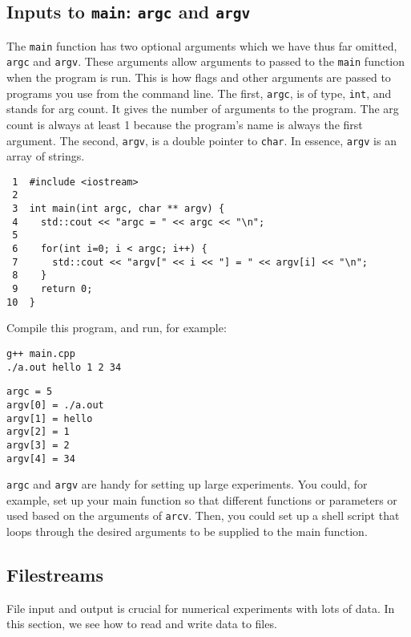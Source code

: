 \documentclass[11pt]{article}
\begin{document}
\subsection{Inputs to \texttt{main}: \texttt{argc} and \texttt{argv}}
\label{sec:orgheadline35}
The \texttt{main} function has two optional arguments which we have thus far omitted, 
\texttt{argc} and \texttt{argv}. These arguments allow arguments to passed to the \texttt{main} 
function when the program is run. This is how flags and other arguments are 
passed to programs you use from the command line. The first, \texttt{argc}, is of 
type, \texttt{int}, and stands for arg count. It gives the number of arguments 
to the program. The arg count is always at least 1 because the program's 
name is always the first argument. The second, \texttt{argv}, is a double pointer to
\texttt{char}. In essence, \texttt{argv} is an array of strings.

\begin{verbatim}
 1  #include <iostream>
 2  
 3  int main(int argc, char ** argv) {
 4    std::cout << "argc = " << argc << "\n";
 5  
 6    for(int i=0; i < argc; i++) {
 7      std::cout << "argv[" << i << "] = " << argv[i] << "\n";
 8    }
 9    return 0;
10  }
\end{verbatim}

Compile this program, and run, for example:

\begin{verbatim}
g++ main.cpp
./a.out hello 1 2 34
\end{verbatim}

\begin{verbatim}
argc = 5
argv[0] = ./a.out
argv[1] = hello
argv[2] = 1
argv[3] = 2
argv[4] = 34
\end{verbatim}

\texttt{argc} and \texttt{argv} are handy for setting up large experiments. You could, for 
example, set up your main function so that different functions or parameters 
or used based on the arguments of \texttt{arcv}. Then, you could set up a shell 
script that loops through the desired arguments to be supplied to the main 
function.

\subsection{Filestreams}
\label{sec:orgheadline38}
File input and output is crucial for numerical experiments with lots of data. 
In this section, we see how to read and write data to files.
\end{document}
